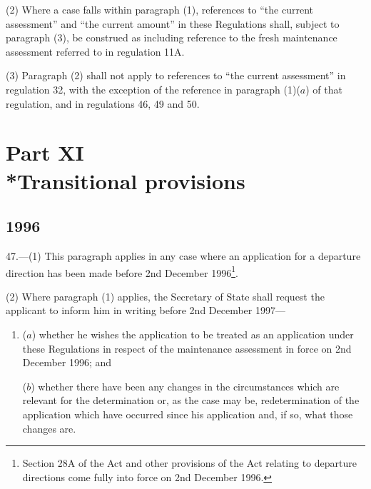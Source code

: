 \documentclass[12pt,a4paper]{article}
\begin{document}
(2) Where a case falls within paragraph (1), references to “the current assessment” and “the current amount” in these Regulations shall, subject to paragraph (3), be construed as including reference to the fresh maintenance assessment referred to in regulation 11A.

(3) Paragraph (2) shall not apply to references to “the current assessment” in regulation 32, with the exception of the reference in paragraph (1)($a$) of that regulation, and in regulations 46, 49 and 50.


\section[Part XI --- Transitional provisions]{Part XI\\*Transitional provisions}

\renewcommand\parthead{--- Part XI}

\subsection[47. Transitional provisions—application before 2nd
December 1996]{\sloppy {} 1996}

47.—(1) This paragraph applies in any case where an application for
a departure direction has been made before 2nd December 1996\footnote{\frenchspacing Section 28A of the Act and other provisions of the Act relating to departure directions come fully into force on 2nd December 1996.}.

(2) Where paragraph (1) applies, the Secretary of State shall request the
applicant to inform him in writing before 2nd December 1997—
\begin{enumerate}\item[]
($a$) whether he wishes the application to be treated as an application under these
Regulations in respect of the maintenance assessment in force on 2nd December
1996; and

($b$) whether there have been any changes in the circumstances which are relevant
for the determination or, as the case may be, redetermination of the application
which have occurred since his application and, if so, what those changes are.
\end{enumerate}
\end{document}

